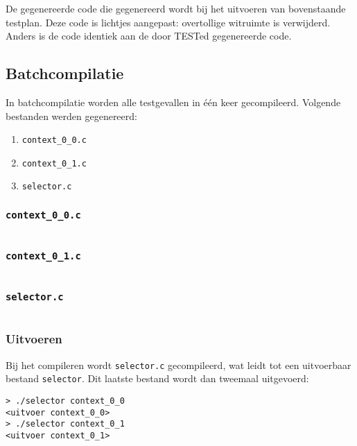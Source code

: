 De gegenereerde code die gegenereerd wordt bij het uitvoeren van bovenstaande testplan.
Deze code is lichtjes aangepast: overtollige witruimte is verwijderd.
Anders is de code identiek aan de door TESTed gegenereerde code.

\subsection{Batchcompilatie}\label{subsec:echo-batchcompilatie}

In batchcompilatie worden alle testgevallen in één keer gecompileerd.
Volgende bestanden werden gegenereerd:

\begin{enumerate}
    \item \texttt{context\_0\_0.c}
    \item \texttt{context\_0\_1.c}
    \item \texttt{selector.c}
\end{enumerate}

\subsubsection{\texttt{context\_0\_0.c}}

\inputminted{c}{sources/echo-c/context_0_0.c}

\subsubsection{\texttt{context\_0\_1.c}}

\inputminted{c}{sources/echo-c/context_0_1.c}

\subsubsection{\texttt{selector.c}}

\inputminted{c}{sources/echo-c/selector.c}

\subsubsection{Uitvoeren}

Bij het compileren wordt \texttt{selector.c} gecompileerd, wat leidt tot een uitvoerbaar bestand \texttt{selector}.
Dit laatste bestand wordt dan tweemaal uitgevoerd:

\begin{verbatim}
> ./selector context_0_0
<uitvoer context_0_0>
> ./selector context_0_1
<uitvoer context_0_1>    
\end{verbatim}

